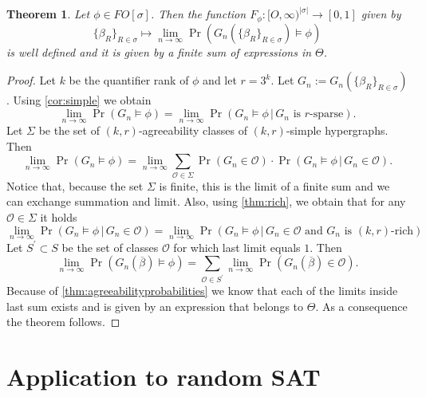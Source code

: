\documentclass[12pt,notitlepage,a4paper]{article}
\newtheorem{theorem}{Theorem}[section]
\theoremstyle{definition}
\newcommand{\N}{\mathbb{N}}
\newcommand{\Ln}{\lim\limits_{n\to \infty}}
\begin{document}
\begin{theorem}
	Let $\phi\in FO[\sigma]$. Then the function 
	$F_\phi: [O,\infty)^{|\sigma|}\rightarrow [0,1]$
	given by
	\[
	\{\beta_R\}_{R\in \sigma} \mapsto
	\Ln \Pr \left(
	G_n\left(\{\beta_R\}_{R\in \sigma}\right) \models \phi
	\right)
	\]
	is well defined and it is given by a finite sum of expressions
	in $\Theta$.
\end{theorem}
\begin{proof}
	Let $k$ be the quantifier rank of $\phi$ and
	let $r=3^k$. Let 
	$G_n:=G_n\left(\{\beta_R\}_{R\in \sigma}\right)$.
	Using \cref{cor:simple} we obtain
	\[
	\Ln \Pr \left(
	G_n \models \phi
	\right)=
	\Ln \Pr \left(
	G_n\models \phi
	\, \Big|
	\, G_n
	\text{ is $r$-sparse}
	\right).
	\]
	Let $\Sigma$ be the set of $(k,r)$-agreeability classes of 
	$(k,r)$-simple hypergraphs. 
	Then
	\begin{equation} \label{eq:aux1}
	\Ln \Pr \left(
	G_n \models \phi
	\right)=
	\Ln
	\sum_{\mathcal{O}\in \Sigma} \Pr\left(
	G_n\in \mathcal{O}
	\right) \cdot 
	\Pr\left(
	G_n\models \phi \,
	\Big| \,
	G_n\in \mathcal{O}
	\right).
	\end{equation}
	Notice that, because the set $\Sigma$ is finite, 
	this is the limit of a finite sum and we can exchange
	summation and limit. Also, 
	using \cref{thm:rich}, we obtain that for any $\mathcal{O}\in \Sigma$
	it holds
	\[
	\Ln \Pr\left(
	G_n\models \phi \,
	\Big| \,
	G_n\in \mathcal{O}
	\right) = 
		\Ln \Pr\left(
	G_n\models \phi \,
	\Big| \,
	G_n\in \mathcal{O}
 	\text{ and } G_n \text{ 
	is $(k,r)$-rich} 	\right)	
	\]
	Let $S^\prime\subset S$ be the set of classes 
	$\mathcal{O}$ for which last limit equals $1$. Then
	\[
	\Ln \Pr \left(
	G_n(\overline{\beta}) \models \phi
	\right)=
	\sum_{\mathcal{O}\in S^\prime}
	\Ln \Pr\left(
	G_n(\overline{\beta})\in \mathcal{O}
	\right).		
	\]
	Because of \cref{thm:agreeabilityprobabilities} we know that
	each of the limits inside last sum exists and is given by
	an expression that belongs to $\Theta$. As a consequence the
	theorem follows. 	
\end{proof}

\section{Application to random SAT}

\end{document}
